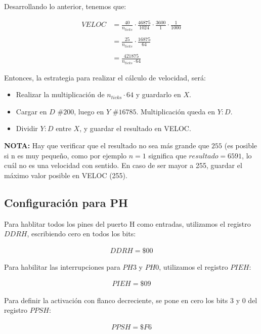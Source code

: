 \documentclass[12pt,letterpaper]{report} %
\begin{document}
Desarrollando lo anterior, tenemos que:

\begin{align*}
    VELOC &= \frac{40}{n_{ticks}} \cdot \frac{46875}{1024} \cdot \frac{3600}{1} \cdot \frac{1}{1000} \\ \\
          &= \frac{25}{n_{ticks}} \cdot \frac{16875}{64} \\ \\ 
          &= \frac{421875}{n_{ticks} \cdot 64}  
\end{align*}
    
Entonces, la estrategia para realizar el cálculo de velocidad, será:

\begin{itemize}
    \item Realizar la multiplicación de $n_{ticks} \cdot 64$ y guardarlo en $X$.
    \item Cargar en $D$ $\#200$, luego en $Y$ $\#16785$. Multiplicación queda en $Y:D$.
    \item Dividir $Y:D$ entre $X$, y guardar el resultado en VELOC. 
\end{itemize}

\textbf{NOTA:} Hay que verificar que el resultado no sea más grande que $255$ (es posible si n es muy pequeño, como por ejemplo $n=1$ significa que $resultado = 6591$, lo cuál no es una velocidad con sentido. En caso de ser mayor a 255, guardar el máximo valor posible en VELOC (255).


\subsection{Configuración para PH}

Para hablitar todos los pines del puerto H como entradas, utilizamos el registro $DDRH$, escribiendo cero en todos los bits:

\begin{align*}
    DDRH = \$00
\end{align*}

Para habilitar las interrupciones para $PH3$ y $PH0$, utilizamos el registro $PIEH$:

\begin{align}
    PIEH = \$09
\end{align}

Para definir la activación con flanco decreciente, se pone en cero los bits 3 y 0 del registro $PPSH$:

\begin{align*}
    PPSH = \$F6
\end{align*}
\end{document}
